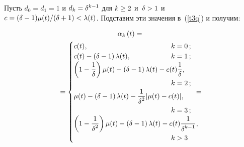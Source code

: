 \begin{multicols}{2}
\vspace*{-2pt}

 Пусть $ d_0=d_1=1$ и $ d_k \hm= \delta^{k-1} $ для $ k\hm \ge 2 $ и~$ \delta\hm > 1 $ 
и $ c \hm=({\delta-1})\mu(t)/({\delta+1}) \hm< \lambda(t)$. Подставим эти значения в~(\ref{t3q}) 
и получим:

\vspace*{-22pt}

 \begin{multline*}
    \alpha_{k}\left( t\right) ={}\\
    {}=
    \begin{cases}
        c(t), &  \hspace*{-17mm}k= 0\,;\\
        c(t) - \left(\delta - 1\right) \lambda(t), & \hspace*{-17mm}k = 1\,;\\
        \left(1-\fr{1}{\delta}\right) \mu(t) -\left(\delta - 1\right) 
\lambda(t) - c(t) \fr{1}{\delta}, &\\
&\hspace*{-17mm}k = 2\,;\\
        \mu(t) -\left(\delta - 1\right) \lambda(t) - 
\fr{1}{\delta^2}|\mu(t) - c(t)|, &\\
&\hspace*{-17mm}k = 3\,;\\
        \left(1-\fr{1}{\delta^2}\right) \mu(t) -\left(\delta - 1\right) 
\lambda(t) - c(t) \fr{1}{\delta^{k-1}}, &\\
&\hspace*{-17mm}k > 3\\
    \end{cases} \!\!\!\!\!\!\!\!\!\!={}
    \end{multline*}
    

\end{multicols}
